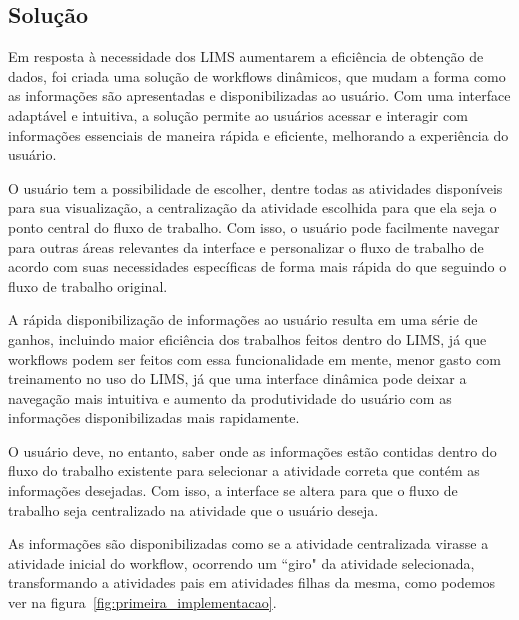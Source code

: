 \subsection{Solução}

Em resposta à necessidade dos LIMS aumentarem a eficiência de obtenção de dados, foi criada uma solução de workflows dinâmicos, que mudam a forma como as informações são apresentadas e disponibilizadas ao usuário.
Com uma interface adaptável e intuitiva, a solução permite ao usuários acessar e interagir com informações essenciais de maneira rápida e eficiente, melhorando a experiência do usuário.

O usuário tem a possibilidade de escolher, dentre todas as atividades disponíveis para sua visualização, a centralização da atividade escolhida para que ela seja o ponto central do fluxo de trabalho. Com isso, o usuário pode facilmente navegar para outras áreas relevantes da interface e personalizar o fluxo de trabalho de acordo com suas necessidades específicas de forma mais rápida do que seguindo o fluxo de trabalho original.

A rápida disponibilização de informações ao usuário resulta em uma série de ganhos, incluindo maior eficiência dos trabalhos feitos dentro do LIMS, já que workflows podem ser feitos com essa funcionalidade em mente, menor gasto com treinamento no uso do LIMS, já que uma interface dinâmica pode deixar a navegação mais intuitiva e aumento da produtividade do usuário com as informações disponibilizadas mais rapidamente.

O usuário deve, no entanto, saber onde as informações estão contidas dentro do fluxo do trabalho existente para selecionar a atividade correta que contém as informações desejadas. Com isso, a interface se altera para que o fluxo de trabalho seja centralizado na atividade que o usuário deseja.

As informações são disponibilizadas como se a atividade centralizada virasse a atividade inicial do workflow, ocorrendo um ``giro" da atividade selecionada, transformando a atividades pais em atividades filhas da mesma, como podemos ver na figura~\ref{fig:primeira_implementacao}.

